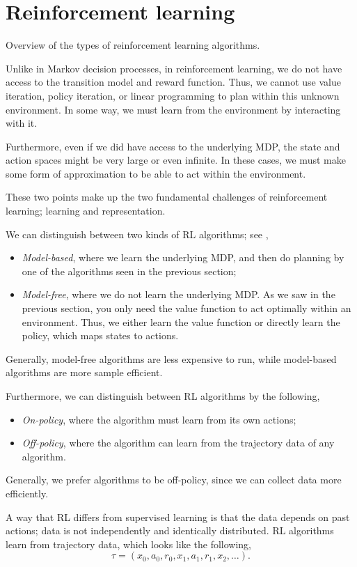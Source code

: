 \section{Reinforcement learning}

\begin{marginfigure}
    \centering
    \caption{Overview of the types of reinforcement learning algorithms.}
    \label{fig:reinforcement-learning-algorithms}
\end{marginfigure}

Unlike in Markov decision processes, in reinforcement learning, we do not have access to the
transition model and reward function. Thus, we cannot use value iteration, policy iteration, or
linear programming to plan within this unknown environment. In some way, we must learn from the
environment by interacting with it.

Furthermore, even if we did have access to the underlying MDP, the state and action spaces might be
very large or even infinite. In these cases, we must make some form of approximation to be able to
act within the environment.

These two points make up the two fundamental challenges of reinforcement learning; learning and
representation.

We can distinguish between two kinds of RL algorithms; see
,
\begin{itemize}
    \item \textit{Model-based}, where we learn the underlying MDP, and then do planning by one of the
          algorithms seen in the previous section;

    \item \textit{Model-free}, where we do not learn the underlying MDP. As we saw in the previous
          section, you only need the value function to act optimally within an environment. Thus, we
          either learn the value function or directly learn the policy, which maps states to actions.
\end{itemize}
Generally, model-free algorithms are less expensive to run, while model-based algorithms are more
sample efficient.

Furthermore, we can distinguish between RL algorithms by the following,
\begin{itemize}
    \item \textit{On-policy}, where the algorithm must learn from its own actions;
    \item \textit{Off-policy}, where the algorithm can learn from the trajectory data of any algorithm.
\end{itemize}
Generally, we prefer algorithms to be off-policy, since we can collect data more efficiently.

A way that RL differs from supervised learning is that the data depends on past actions; data is
not independently and identically distributed. RL algorithms learn from trajectory data, which
looks like the following, \[
    \tau = (x_0,a_0,r_0,x_1,a_1,r_1,x_2, \ldots).
\]
